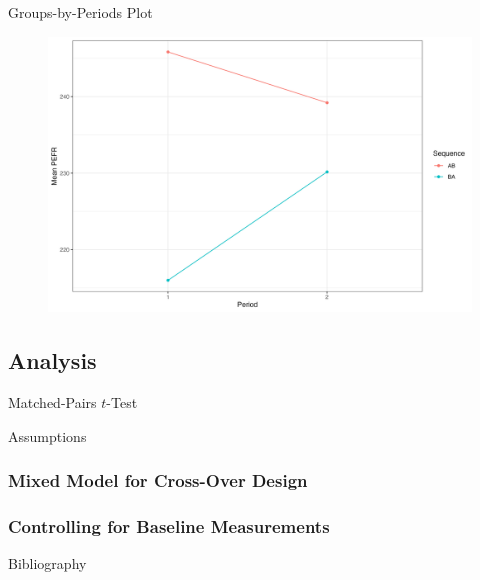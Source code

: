 \documentclass{beamer}
\begin{document}
\begin{frame}{Groups-by-Periods Plot}
    \begin{figure}
        \centering
        \includegraphics[width=\linewidth]{report/figures/ch2/groupsByPeriodsPlot.png}
    \end{figure}
\end{frame}

\subsection{Analysis}
\begin{frame}{Matched-Pairs $t$-Test}
    
\end{frame}

\begin{frame}{Assumptions}
    
\end{frame}
\subsubsection{Mixed Model for Cross-Over Design}

\subsubsection{Controlling for Baseline Measurements}

\begin{frame}{Bibliography}
    
    
\end{frame}
\end{document}
